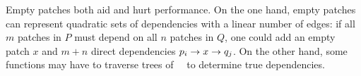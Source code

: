 Empty patches both aid and hurt performance.
%
On the one hand, empty patches can represent quadratic sets of dependencies
 with a linear number of edges: if all $m$ patches in $P$ must depend on
 all $n$ patches in $Q$, one could 
 add an empty patch $x$ and $m+n$ direct dependencies
 $p_i \rightarrow x \rightarrow q_j$.
%
On the other hand, some functions may have to traverse trees of \noop\
 \chdescs\ to determine true dependencies.


\begin{comment}
To solve this problem, we introduce an additional type of \chdesc. The
prototypical \chdesc\ corresponds to some change on disk, but \Kudos\ also
supports \aemphnoop\ \chdesc\ type, which doesn't change the disk at all.
\Noop\ \chdescs\ can have \befores, like other \chdescs, but they don't need to
be written to disk: they are trivially satisfied when all of their \befores\ are
satisfied. Thus, they can be used to ``stand for'' entire sets of other changes.
%
This capability is extremely useful, and is used by most operations on disk
structures so that a single \chdesc\ can be returned that depends on the whole
change. Likewise, \anoop\ \chdesc\ can be passed in as a parameter to a disk
operation to make the whole operation depend on a set of other changes. \Noop\
\chdescs\ allow dependencies between sets with only a linear number of
dependency edges in the \chdesc\ graph, and without having to pass around arrays
of \chdescs.
%
The cost is that some functions may have to traverse trees of \noop\ \chdescs\
to determine true dependencies.
\end{comment}
